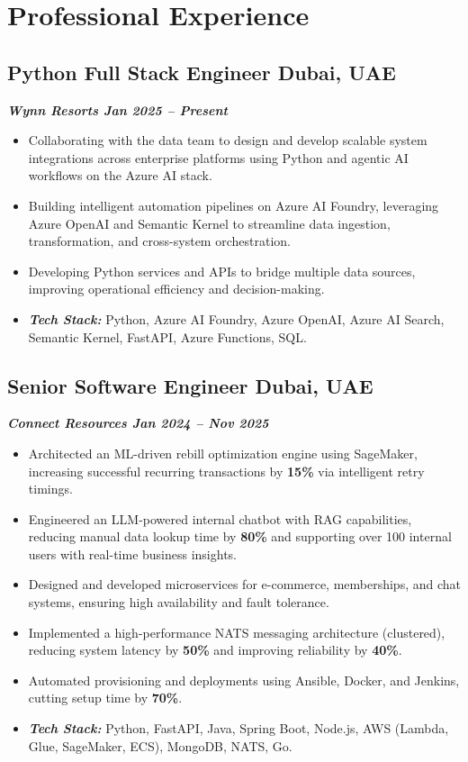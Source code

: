 \documentclass[a4paper,11pt]{article}
\begin{document}
\section*{Professional Experience}

\subsection*{Python Full Stack Engineer \hfill Dubai, UAE}
\vspace{-0.6em}
\textbf{\textit{Wynn Resorts \hfill Jan 2025 -- Present}}
\vspace{-0.6em}
\begin{itemize}
    \item Collaborating with the data team to design and develop scalable system integrations across enterprise platforms using Python and agentic AI workflows on the Azure AI stack.
    \item Building intelligent automation pipelines on Azure AI Foundry, leveraging Azure OpenAI and Semantic Kernel to streamline data ingestion, transformation, and cross-system orchestration.
    \item Developing Python services and APIs to bridge multiple data sources, improving operational efficiency and decision-making.
    \item \textit{\textbf{Tech Stack:}} Python, Azure AI Foundry, Azure OpenAI, Azure AI Search, Semantic Kernel, FastAPI, Azure Functions, SQL.
\end{itemize}

\subsection*{Senior Software Engineer \hfill Dubai, UAE}
\vspace{-0.6em}
\textbf{\textit{Connect Resources \hfill Jan 2024 -- Nov 2025}}
\vspace{-0.6em}
\begin{itemize}
    \item Architected an ML-driven rebill optimization engine using SageMaker, increasing successful recurring transactions by \textbf{15\%} via intelligent retry timings.
    \item Engineered an LLM-powered internal chatbot with RAG capabilities, reducing manual data lookup time by \textbf{80\%} and supporting over 100 internal users with real-time business insights.
    \item Designed and developed microservices for e-commerce, memberships, and chat systems, ensuring high availability and fault tolerance.
    \item Implemented a high-performance NATS messaging architecture (clustered), reducing system latency by \textbf{50\%} and improving reliability by \textbf{40\%}.
    \item Automated provisioning and deployments using Ansible, Docker, and Jenkins, cutting setup time by \textbf{70\%}.
    \item \textit{\textbf{Tech Stack:}} Python, FastAPI, Java, Spring Boot, Node.js, AWS (Lambda, Glue, SageMaker, ECS), MongoDB, NATS, Go.
\end{itemize}
\end{document}

